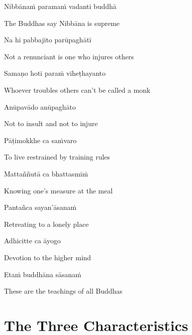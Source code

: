 Nibbānaṁ paramaṁ vadanti buddhā

\begin{english}
  The Buddhas say Nibbāna is supreme
\end{english}

Na hi pabbajito parūpaghātī

\begin{english}
  Not a renunciant is one who injures others
\end{english}

Samaṇo hoti paraṁ viheṭhayanto

\begin{english}
  Whoever troubles others can't be called a monk
\end{english}

Anūpavādo anūpaghāto

\begin{english}
  Not to insult and not to injure
\end{english}

Pāṭimokkhe ca saṁvaro

\begin{english}
  To live restrained by training rules
\end{english}

Mattaññutā ca bhattasmiṁ

\begin{english}
  Knowing one's measure at the meal
\end{english}

Pantañca sayan'āsanaṁ

\begin{english}
  Retreating to a lonely place
\end{english}

Adhicitte ca āyogo

\begin{english}
  Devotion to the higher mind
\end{english}

Etaṁ buddhāna sāsanaṁ

\begin{english}
  These are the teachings of all Buddhas
\end{english}

\suttaRef{[Dhp 183-185]}


\section{The Three Characteristics}
\label{three-characteristics}

